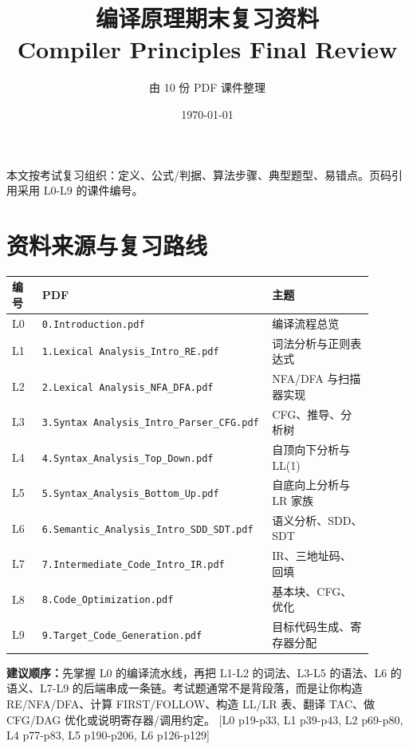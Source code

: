 \documentclass[UTF8,fontset=none,11pt]{ctexart}
\title{\textbf{编译原理期末复习资料}\\{\large Compiler Principles Final Review}}
\author{由 10 份 PDF 课件整理}
\date{\today}
\newcommand{\pg}[1]{{\scriptsize\textcolor{citegray}{[#1]}}}
\newcommand{\code}[1]{\texttt{#1}}
\begin{document}
\maketitle

\begin{center}
\small
本文按考试复习组织：定义、公式/判据、算法步骤、典型题型、易错点。页码引用采用 L0-L9 的课件编号。
\end{center}

\tableofcontents
\newpage

\section{资料来源与复习路线}

\begin{longtable}{p{0.08\linewidth}p{0.55\linewidth}p{0.27\linewidth}}
\toprule
编号 & PDF & 主题 \\
\midrule
L0 & \code{0.Introduction.pdf} & 编译流程总览 \\
L1 & \code{1.Lexical Analysis\_Intro\_RE.pdf} & 词法分析与正则表达式 \\
L2 & \code{2.Lexical Analysis\_NFA\_DFA.pdf} & NFA/DFA 与扫描器实现 \\
L3 & \code{3.Syntax Analysis\_Intro\_Parser\_CFG.pdf} & CFG、推导、分析树 \\
L4 & \code{4.Syntax\_Analysis\_Top\_Down.pdf} & 自顶向下分析与 LL(1) \\
L5 & \code{5.Syntax\_Analysis\_Bottom\_Up.pdf} & 自底向上分析与 LR 家族 \\
L6 & \code{6.Semantic\_Analysis\_Intro\_SDD\_SDT.pdf} & 语义分析、SDD、SDT \\
L7 & \code{7.Intermediate\_Code\_Intro\_IR.pdf} & IR、三地址码、回填 \\
L8 & \code{8.Code\_Optimization.pdf} & 基本块、CFG、优化 \\
L9 & \code{9.Target\_Code\_Generation.pdf} & 目标代码生成、寄存器分配 \\
\bottomrule
\end{longtable}

\textbf{建议顺序：}先掌握 L0 的编译流水线，再把 L1-L2 的词法、L3-L5 的语法、L6 的语义、L7-L9 的后端串成一条链。考试题通常不是背段落，而是让你构造 RE/NFA/DFA、计算 FIRST/FOLLOW、构造 LL/LR 表、翻译 TAC、做 CFG/DAG 优化或说明寄存器/调用约定。 \pg{L0 p19-p33, L1 p39-p43, L2 p69-p80, L4 p77-p83, L5 p190-p206, L6 p126-p129}
\end{document}

